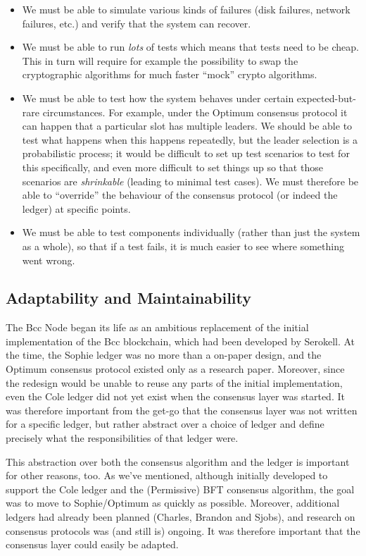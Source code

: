 \begin{itemize}
\item We must be able to simulate various kinds of failures (disk
failures, network failures, etc.) and verify that the system can recover.
\item We must be able to run \emph{lots} of tests which means that tests need to
be cheap. This in turn will require for example the possibility to swap the
cryptographic algorithms for much faster ``mock'' crypto algorithms.
\item We must be able to test how the system behaves under certain
expected-but-rare circumstances. For example, under the Optimum consensus
protocol it can happen that a particular slot has multiple leaders. We should be
able to test what happens when this happens repeatedly, but the leader selection
is a probabilistic process; it would be difficult to set up test scenarios to
test for this specifically, and even more difficult to set things up so that
those scenarios are \emph{shrinkable} (leading to minimal test cases). We must
therefore be able to ``override'' the behaviour of the consensus protocol (or
indeed the ledger) at specific points.
\item We must be able to test components individually (rather than just the
system as a whole), so that if a test fails, it is much easier to see where
something went wrong.
\end{itemize}

\subsection{Adaptability and Maintainability}
\label{adaptability}

The Bcc Node began its life as an ambitious replacement of the initial
implementation of the Bcc blockchain, which had been developed by Serokell.
At the time, the Sophie ledger was no more than a on-paper design, and
the Optimum consensus protocol existed only as a research paper. Moreover, since
the redesign would be unable to reuse any parts of the initial implementation,
even the Cole ledger did not yet exist when the consensus layer was started.
It was therefore important from the get-go that the consensus layer was not
written for a specific ledger, but rather abstract over a choice of ledger
and define precisely what the responsibilities of that ledger were.

This abstraction over both the consensus algorithm and the ledger is important
for other reasons, too. As we've mentioned, although initially developed to
support the Cole ledger and the (Permissive) BFT consensus algorithm, the goal
was to move to Sophie/Optimum as quickly as possible. Moreover, additional
ledgers had already been planned (Charles, Brandon and Sjobs), and research on
consensus protocols was (and still is) ongoing. It was therefore important that
the consensus layer could easily be adapted.

